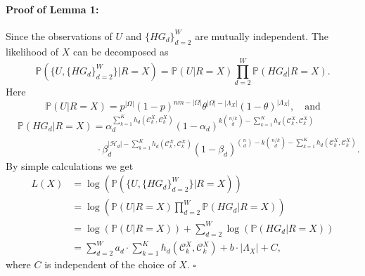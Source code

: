 \documentclass{article}
\newcommand\af{\alpha_d}
\newcommand\bt{\beta_d}
\newcommand\HG{\{ HG_d \}_{d=2}^W}
\begin{document}
 \paragraph{Proof of Lemma 1:} 
Since the observations of $U$ and $\HG$ are mutually independent. The likelihood of $X$ can be decomposed as
\begin{equation}\label{12}
\mathbb{P}\left(\{U, \HG\}|R=X \right)=\mathbb{P}\left(U | R=X \right) \prod_{d=2}^{W}\mathbb{P}\left(HG_d | R=X \right).
\end{equation}
Here
\begin{equation}
\mathbb{P}\left(U | R=X \right) = p^{|\Omega|}(1-p)^{nm - |\Omega|} \theta^{|\Omega|-|\Lambda_X|}(1-\theta)^{|\Lambda_X|}, \quad  \text{and} \label{13}
\end{equation}
\begin{equation}\label{14}
\begin{aligned}
    & \mathbb{P}(HG_d | R=X) = \af^{\sum_{k=1}^K h_d( \mathcal{C}_k^X, \mathcal{C}_k^X)} (1-\af)^{{k\binom{n/k}{d}}-\sum_{k=1}^K h_d( \mathcal{C}_k^X, \mathcal{C}_k^X)} \\
    &\qquad\qquad\qquad\qquad \cdot \bt ^{|\mathcal{H}_d| - \sum_{k=1}^K h_d( \mathcal{C}_k^X, \mathcal{C}_k^X)} (1-\bt)^{\binom{n}{d}-k\binom{n/k}{d}-\sum_{k=1}^K h_d( \mathcal{C}_k^X, \mathcal{C}_k^X)}.
\end{aligned}
\end{equation}
By simple calculations we get
\begin{equation}\label{15}
		\begin{aligned}
			L(X) & = \log \left( \mathbb{P}\left(\{U, \HG\}|R=X \right) \right) \\
			& = \log \left( \mathbb{P}\left(U | R=X \right) \prod_{d=2}^{W}\mathbb{P}\left(HG_d | R=X \right) \right) \\
			& = \log \left( \mathbb{P}\left(U | R=X \right) \right) +\sum_{d=2}^{W} \log \left( \mathbb{P}\left(HG_d | R=X \right) \right) \\
			& = \sum_{d=2}^{W} a_d \cdot \sum_{k=1}^K h_d( \mathcal{C}_k^X, \mathcal{C}_k^X) +  b \cdot |\Lambda_X| + C,
		\end{aligned}
	\end{equation}
	where $C$ is independent of the choice of $X$. 
 \hfill $\square$\par
\end{document}
